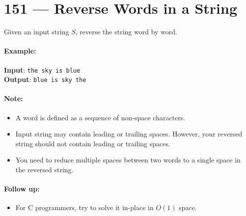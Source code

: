 \section{151 --- Reverse Words in a String}
Given an input string $S$, reverse the string word by word.
\paragraph{Example:}
\begin{flushleft}
\textbf{Input}: \texttt{the sky is blue}
\\
\textbf{Output}: \texttt{blue is sky the}
\end{flushleft}
\paragraph{Note:}
\begin{itemize}
    \item A word is defined as a sequence of non-space characters.
    \item Input string may contain leading or trailing spaces. However, your reversed string should not contain leading or trailing spaces.
    \item You need to reduce multiple spaces between two words to a single space in the reversed string.
\end{itemize}
\paragraph{Follow up:}
\begin{itemize}
    \item For C programmers, try to solve it in-place in $O(1)$ space.
\end{itemize}    
